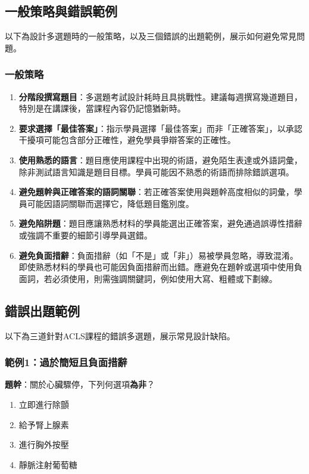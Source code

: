 \documentclass[12pt,a4paper]{article}
\begin{document}
\subsection{一般策略與錯誤範例}
以下為設計多選題時的一般策略，以及三個錯誤的出題範例，展示如何避免常見問題。

\subsubsection{一般策略}
\begin{enumerate}
    \item \textbf{分階段撰寫題目}：多選題考試設計耗時且具挑戰性。建議每週撰寫幾道題目，特別是在講課後，當課程內容仍記憶猶新時。
    \item \textbf{要求選擇「最佳答案」}：指示學員選擇「最佳答案」而非「正確答案」，以承認干擾項可能包含部分正確性，避免學員爭辯答案的正確性。
    \item \textbf{使用熟悉的語言}：題目應使用課程中出現的術語，避免陌生表達或外語詞彙，除非測試語言知識是題目目標。學員可能因不熟悉的術語而排除錯誤選項。
    \item \textbf{避免題幹與正確答案的語詞關聯}：若正確答案使用與題幹高度相似的詞彙，學員可能因語詞關聯而選擇它，降低題目鑑別度。
    \item \textbf{避免陷阱題}：題目應讓熟悉材料的學員能選出正確答案，避免通過誤導性措辭或強調不重要的細節引導學員選錯。
    \item \textbf{避免負面措辭}：負面措辭（如「不是」或「非」）易被學員忽略，導致混淆。即使熟悉材料的學員也可能因負面措辭而出錯。應避免在題幹或選項中使用負面詞，若必須使用，則需強調關鍵詞，例如使用大寫、粗體或下劃線。
\end{enumerate}

\subsection{錯誤出題範例}
以下為三道針對ACLS課程的錯誤多選題，展示常見設計缺陷。

\subsubsection{範例1：過於簡短且負面措辭}
\textbf{題幹}：關於心臟驟停，下列何選項\textbf{為非}？

\begin{enumerate}[label=\Alph*.]
    \item 立即進行除顫
    \item 給予腎上腺素
    \item 進行胸外按壓
    \item 靜脈注射葡萄糖
\end{enumerate}
\end{document}
